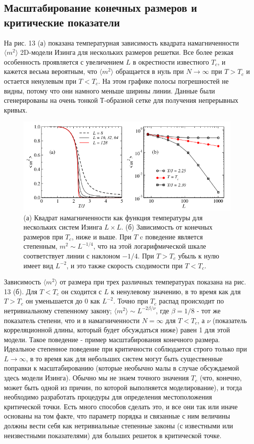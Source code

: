 \documentclass[11pt]{article}
\begin{document}
\subsection{Масштабирование конечных размеров и критические показатели}
На рис. 13 (а) показана температурная зависимость квадрата намагниченности $\langle m^2 \rangle$ 2D-модели Изинга для нескольких размеров решетки. Все более резкая особенность проявляется с увеличением $L$ в окрестности известного $T_c$, и кажется весьма вероятным, что $\langle m^2 \rangle$ обращается в нуль при $N → ∞$ при $T> T_c$ и остается ненулевым при $T <T_c$. На этом графике полосы погрешностей не видны, потому что они намного меньше ширины линии. Данные были сгенерированы на очень тонкой Т-образной сетке для получения непрерывных кривых.

\begin{figure}[htp]
\centering
\includegraphics[scale=0.5]{fig13}
\caption{(а) Квадрат намагниченности как функция температуры для нескольких систем Изинга $L × L$.
(б) Зависимость от конечных размеров при $T_c$, ниже и выше. При $T$ c поведение является степенным, $m^2 \sim L^{−1/4}$, что на этой логарифмической шкале соответствует линии с наклоном $-1/4$. При $T> T_c$ убыль к нулю имеет вид $L^{−2}$, и это также скорость сходимости при $T <T_c$.}
\label{}
\end{figure}

Зависимость $\langle m^2 \rangle$ от размера при трех различных температурах показана на рис. 13 (б). Для $T <T_c$ он сходится с $L$ к ненулевому значению, в то время как для $T> T_c$ он уменьшается до $0$ как $L^{-2}$.
Точно при $T_c$ распад происходит по нетривиальному степенному закону; $\langle m^2 \rangle \sim L^{-2\beta/\nu}$, где $\beta = 1/8$ - тот же показатель степени, что и в намагниченности $N = ∞$ для $T <T_c$, а $\nu$ (показатель корреляционной длины, который будет обсуждаться ниже) равен 1 для этой модели. Такое поведение - пример масштабирования конечного размера. Идеальное степенное поведение при критичности соблюдается строго только при $L → ∞$, в то время как для небольших систем могут быть существенные поправки к масштабированию (которые необычно малы в случае обсуждаемой здесь модели Изинга). Обычно мы не знаем точного значения $T_c$ (что, конечно, может быть одной из причин, по которой выполняется моделирование), и тогда необходимо разработать процедуры для определения местоположения критической точки.
Есть много способов сделать это, и все они так или иначе основаны на том факте, что параметр порядка и связанные с ним величины должны вести себя как нетривиальные степенные законы (с известными или неизвестными показателями) для больших решеток в критической точке.
\end{document}
